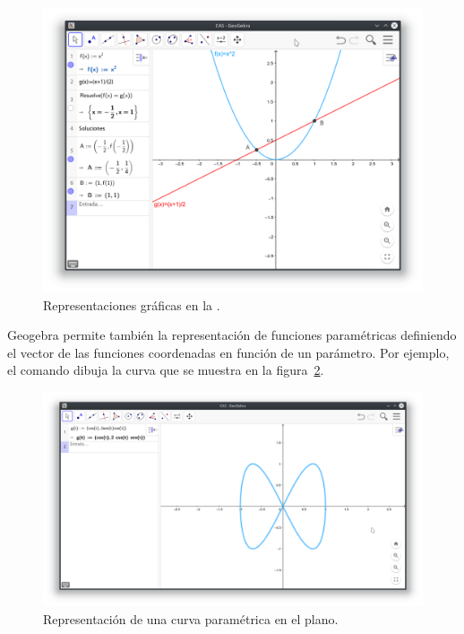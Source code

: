 \begin{figure}[h!]
\begin{center}
\includegraphics[width=\textwidth]{img/introduccion/graphic-view}
\caption{Representaciones gráficas en la .} \label{g:vista-grafica}
\end{center}
\end{figure}

Geogebra permite también la representación de funciones paramétricas definiendo el vector de las funciones coordenadas en función de un parámetro.
Por ejemplo, el comando  dibuja la curva que se muestra en la figura~\ref{g:curva-parametrica}.

\begin{figure}[h!]
\begin{center}
\includegraphics[width=\textwidth]{img/introduccion/parametric-curve}
\caption{Representación de una curva paramétrica en el plano.} \label{g:curva-parametrica}
\end{center}
\end{figure}

